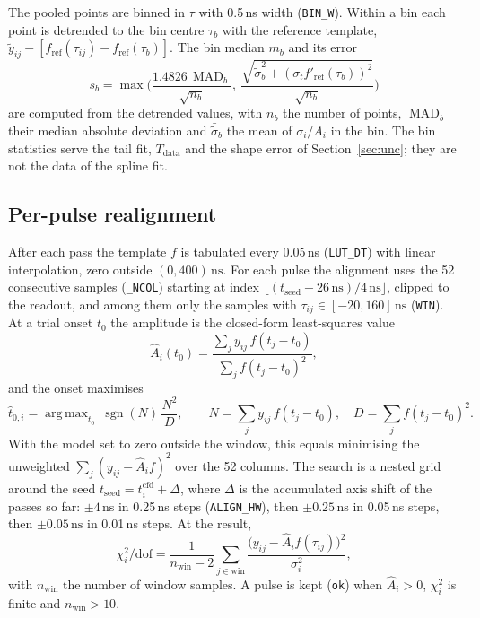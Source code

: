 \documentclass[11pt]{article}
\newcommand{\ns}{\,\mathrm{ns}}
\newcommand{\code}[1]{\texttt{#1}}
\DeclareMathOperator*{\argmax}{arg\,max}
\DeclareMathOperator{\MAD}{MAD}
\DeclareMathOperator{\sgn}{sgn}
\begin{document}
The pooled points are binned in $\tau$ with 0.5\,ns width (\code{BIN\_W}). Within a bin each point is detrended to the bin centre $\tau_b$ with the reference template, $\tilde y_{ij} - [f_{\mathrm{ref}}(\tau_{ij}) - f_{\mathrm{ref}}(\tau_b)]$. The bin median $m_b$ and its error
\begin{equation}
s_b = \max\Big( \frac{1.4826\, \MAD_b}{\sqrt{n_b}},\ \frac{\sqrt{\bar{\tilde\sigma}_b^2 + (\sigma_t f'_{\mathrm{ref}}(\tau_b))^2}}{\sqrt{n_b}} \Big)
\label{eq:sb}
\end{equation}
are computed from the detrended values, with $n_b$ the number of points, $\MAD_b$ their median absolute deviation and $\bar{\tilde\sigma}_b$ the mean of $\sigma_i/A_i$ in the bin. The bin statistics serve the tail fit, $T_{\mathrm{data}}$ and the shape error of Section~\ref{sec:unc}; they are not the data of the spline fit.

\subsection{Per-pulse realignment}
\label{sec:align}

After each pass the template $f$ is tabulated every 0.05\,ns (\code{LUT\_DT}) with linear interpolation, zero outside $(0, 400)\ns$. For each pulse the alignment uses the 52 consecutive samples (\code{\_NCOL}) starting at index $\lfloor (t_{\mathrm{seed}} - 26\ns)/4\ns \rfloor$, clipped to the readout, and among them only the samples with $\tau_{ij} \in [-20, 160]\ns$ (\code{WIN}). At a trial onset $t_0$ the amplitude is the closed-form least-squares value
\begin{equation}
\hat A_i(t_0) = \frac{\sum_j y_{ij}\, f(t_j - t_0)}{\sum_j f(t_j - t_0)^2},
\end{equation}
and the onset maximises
\begin{equation}
\hat t_{0,i} = \argmax_{t_0}\ \sgn(N)\, \frac{N^2}{D},
\qquad N = \sum_j y_{ij}\, f(t_j - t_0),\quad D = \sum_j f(t_j - t_0)^2 .
\label{eq:t0}
\end{equation}
With the model set to zero outside the window, this equals minimising the unweighted $\sum_j (y_{ij} - \hat A_i f)^2$ over the 52 columns. The search is a nested grid around the seed $t_{\mathrm{seed}} = t^{\mathrm{cfd}}_i + \Delta$, where $\Delta$ is the accumulated axis shift of the passes so far: $\pm 4\ns$ in 0.25\,ns steps (\code{ALIGN\_HW}), then $\pm 0.25\ns$ in 0.05\,ns steps, then $\pm 0.05\ns$ in 0.01\,ns steps. At the result,
\begin{equation}
\chi^2_i/\mathrm{dof} = \frac{1}{n_{\mathrm{win}} - 2} \sum_{j \in \mathrm{win}} \frac{\big(y_{ij} - \hat A_i f(\tau_{ij})\big)^2}{\sigma_i^2},
\label{eq:chi2}
\end{equation}
with $n_{\mathrm{win}}$ the number of window samples. A pulse is kept (\code{ok}) when $\hat A_i > 0$, $\chi^2_i$ is finite and $n_{\mathrm{win}} > 10$.
\end{document}
